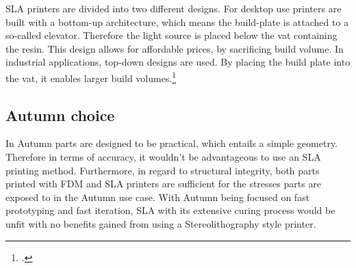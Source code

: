 SLA printers are divided into two different designs. For desktop use printers are built with a bottom-up architecture, which means the build-plate is attached to a so-called elevator. Therefore the light source is placed below the vat containing the resin. This design allows for affordable prices, by sacrificing build volume.\newline
In industrial applications, top-down designs are used. By placing the build plate into the vat, it enables larger build volumes.\footcite{hubsSLA3DPrintingNoDate}

\subsection{Autumn choice}

In Autumn parts are designed to be practical, which entails a simple geometry. Therefore in terms of accuracy, it wouldn't be advantageous to use an SLA printing method. Furthermore, in regard to structural integrity, both parts printed with FDM and SLA printers are sufficient for the stresses parts are exposed to in the Autumn use case. With Autumn being focused on fast prototyping and fast iteration, SLA with its extensive curing process would be unfit with no benefits gained from using a Stereolithography style printer. 


